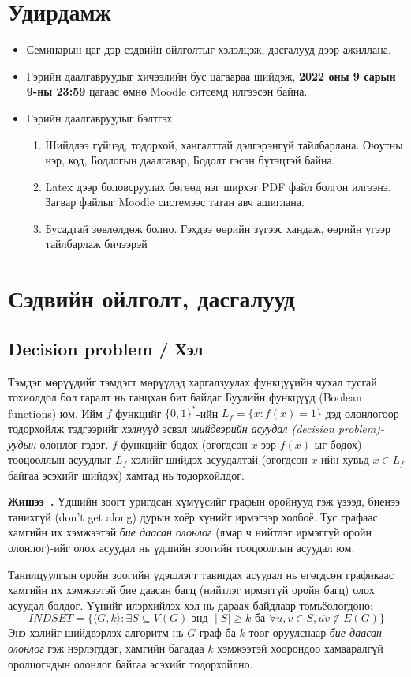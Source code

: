 \documentclass{article}
\newcounter{example}[section]
\newenvironment{example}[1][]{\refstepcounter{example}\par\medskip
   \noindent \textbf{Жишээ~\theexample. #1} \rmfamily}{\medskip}
\begin{document}
\section*{Удирдамж}
\begin{itemize}
  \item Семинарын цаг дэр сэдвийн ойлголтыг хэлэлцэж, дасгалууд дээр ажиллана.
  \item Гэрийн даалгавруудыг хичээлийн бус цагаараа шийдэж, \textbf{2022 оны 9 сарын 9-ны 23:59} цагаас өмнө Moodle ситсемд илгээсэн байна.
  \item Гэрийн даалгавруудыг бэлтгэх
  \begin{enumerate}
    \item Шийдлээ гүйцэд, тодорхой, хангалттай дэлгэрэнгүй тайлбарлана. Оюутны нэр, код, Бодлогын даалгавар, Бодолт гэсэн бүтэцтэй байна.
    \item Latex дээр боловсруулах бөгөөд нэг ширхэг PDF файл болгон илгээнэ. Загвар файлыг Moodle системээс татан авч ашиглана.
    \item Бусадтай зөвлөлдөж болно. Гэхдээ өөрийн зүгээс хандаж, өөрийн үгээр тайлбарлаж бичээрэй
  \end{enumerate}
\end{itemize}
\section*{Сэдвийн ойлголт, дасгалууд}
\subsection{Decision problem / Хэл }
Тэмдэг мөрүүдийг тэмдэгт мөрүүдэд харгалзуулах функцүүийн чухал тусгай тохиолдол бол гаралт нь ганцхан бит байдаг Буулийн функцүүд (Boolean functions) юм. Ийм $f$ функцийг $\{0, 1\}^*$-ийн $L_f = \{x: f (x) = 1\}$ дэд олонлогоор тодорхойлж тэдгээрийг \textit{хэлнүүд} эсвэл  \textit{шийдвэрийн асуудал (decision problem)-уудын} олонлог гэдэг. $f$ функцийг бодох (өгөгдсөн $x$-ээр $f(x)$-ыг бодох) тооцооллын асуудлыг $L_f$ хэлийг шийдэх асуудалтай (өгөгдсөн $x$-ийн хувьд $x\in L_f$ байгаа эсэхийг шийдэх) хамтад нь тодорхойлдог.

\begin{example}
Үдшийн зоогт уригдсан хүмүүсийг графын оройнууд гэж үзээд, биенээ танихгүй (don't get along) дурын хоёр хүнийг ирмэгээр холбоё. Тус графаас хамгийн их хэмжээтэй \textit{бие даасан олонлог} (ямар ч нийтлэг ирмэггүй оройн олонлог)-ийг олох асуудал нь үдшийн зоогийн тооцооллын асуудал юм.

Танилцуулгын оройн зоогийн үдэшлэгт тавигдах асуудал нь өгөгдсөн графикаас хамгийн их хэмжээтэй бие даасан багц (нийтлэг ирмэггүй оройн багц) олох асуудал болдог. Үүнийг илэрхийлэх хэл нь дараах байдлаар томъёологдоно:
$$INDSET = \{\langle G, k \rangle : \exists S \subseteq V(G) \text{ энд } \mid S \mid \geq k \text{ ба } \forall u, v \in  S, \overline{uv} \notin E(G)\}$$
Энэ хэлийг шийдвэрлэх алгоритм нь $G$ граф ба $k$ тоог оруулснаар \textit{бие даасан олонлог} гэж нэрлэгддэг, хамгийн багадаа $k$ хэмжээтэй хоорондоо хамааралгүй оролцогчдын олонлог байгаа эсэхийг тодорхойлно.
\end{example}
\end{document}
